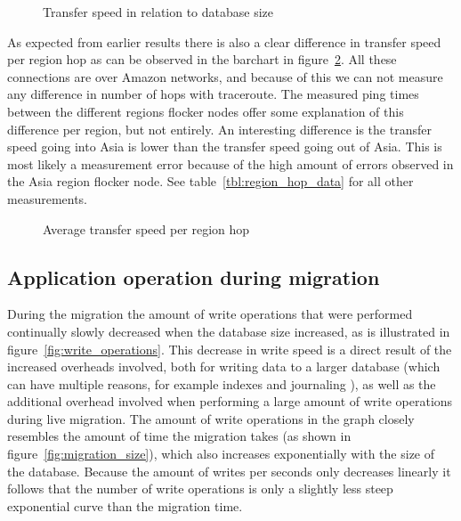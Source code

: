 \documentclass{article}
\begin{document}
\begin{center}
\begin{figure}[!ht]
    \caption{Transfer speed in relation to database size}
    \label{fig:transfer_size}
\end{figure}
\end{center}

As expected from earlier results there is also a clear difference in transfer speed per region hop as can be observed in the barchart in figure~\ref{fig:transfer_region}. All these connections are over Amazon networks, and because of this we can not measure any difference in number of hops with traceroute. The measured ping times between the different regions flocker nodes offer some explanation of this difference per region, but not entirely. An interesting difference is the transfer speed going into Asia is lower than the transfer speed going out of Asia. This is most likely a measurement error because of the high amount of errors observed in the Asia region flocker node. See table~\ref{tbl:region_hop_data} for all other measurements.

\begin{center}
\begin{figure}[!ht]
    \caption{Average transfer speed per region hop}
    \label{fig:transfer_region}
\end{figure}
\end{center}


\subsection{Application operation during migration}

During the migration the amount of write operations that were performed continually slowly decreased when the database size increased, as is illustrated in figure~\ref{fig:write_operations}. This decrease in write speed is a direct result of the increased overheads involved, both for writing data to a larger database (which can have multiple reasons, for example indexes and journaling \cite{mongodb-growth}), as well as the additional overhead involved when performing a large amount of write operations during live migration. The amount of write operations in the graph closely resembles the amount of time the migration takes (as shown in figure~\ref{fig:migration_size}), which also increases exponentially with the size of the database. Because the amount of writes per seconds only decreases linearly it follows that the number of write operations is only a slightly less steep exponential curve than the migration time.
\end{document}
